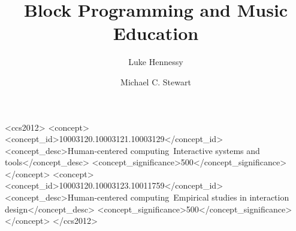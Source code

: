 \documentclass[manuscript,screen,review]{acmart}
\begin{document}
\title{Block Programming and Music Education}

\author{Luke Hennessy}
\author{Michael C. Stewart}

\renewcommand{\shortauthors}{Hennessy, et al.}


\begin{CCSXML}
<ccs2012>
   <concept>
       <concept_id>10003120.10003121.10003129</concept_id>
       <concept_desc>Human-centered computing~Interactive systems and tools</concept_desc>
       <concept_significance>500</concept_significance>
       </concept>
   <concept>
       <concept_id>10003120.10003123.10011759</concept_id>
       <concept_desc>Human-centered computing~Empirical studies in interaction design</concept_desc>
       <concept_significance>500</concept_significance>
       </concept>
 </ccs2012>
\end{CCSXML}




\end{document}
